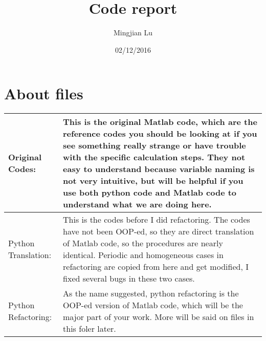 \documentclass[letter,12pt]{article}
\title{Code report}
\author{Mingjian Lu}
\date{02/12/2016}
\begin{document}
\maketitle
\pagebreak
\tableofcontents
\pagebreak

\section{About files}
\begin{table}[h]
{\renewcommand\arraystretch{1.25}
\begin{tabular}{|l|l|l|} \hline
Original Codes:& \multicolumn{2}{p{12cm}|}{This is the original Matlab code, which are the reference codes you should be looking at if you see something really strange or have trouble with the specific calculation steps. They not easy to understand because variable naming is not very intuitive, but will be helpful if you use both python code and Matlab code to understand what we are doing here.} \\ \hline
Python Translation:& \multicolumn{2}{p{12cm}|}{\raggedright This is the codes before I did refactoring. The codes have not been OOP-ed, so they are direct translation of Matlab code, so the procedures are nearly identical. Periodic and homogeneous cases in refactoring are copied from here and get modified, I fixed several bugs in these two cases.} \\ \hline
Python Refactoring:& \multicolumn{2}{p{12cm}|}{\raggedright As the name suggested, python refactoring is the OOP-ed version of Matlab code, which will be the major part of your work. More will be said on files in this foler later.} \\ \hline
\end{tabular}}
\end{table}
\end{document}
